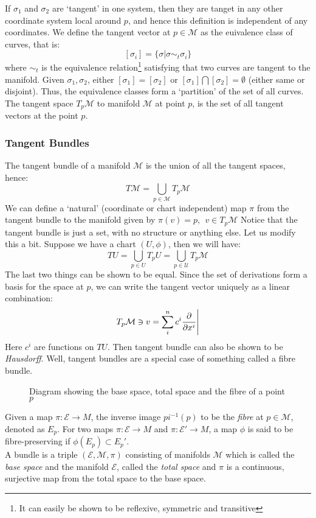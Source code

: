 If $\sigma_1$ and $\sigma_2$ are `tangent' in one system, then they are tanget in any other coordinate system local around $p$, and hence this definition is independent of any coordinates. We define the tangent vector at $p \in \mathcal{M}$ as the euivalence class of curves, that is:
$$[\sigma_i] = \{\sigma | \sigma \sim_t \sigma_i \}$$
where $\sim_t$ is the equivalence relation\footnote{It can easily be shown to be reflexive, symmetric and transitive} satisfying that two curves are tangent to the manifold. Given $\sigma_1, \sigma_2$, either $[\sigma_1]=[\sigma_2]$ or $[\sigma_1]\bigcap [\sigma_2] = \emptyset$ (either same or disjoint). Thus, the equivalence classes form a `partition' of the set of all curves. The tangent space $T_p\mathcal{M}$ to manifold $\mathcal{M}$ at point $p$, is the set of all tangent vectors at the point $p$. 
\subsubsection{Tangent Bundles}
The tangent bundle of a manifold $\mathcal{M}$ is the union of all the tangent spaces, hence: 
$$T\mathcal{M} = \bigcup\limits_{p\in \mathcal{M}}T_p\mathcal{M}$$
We can define a `natural' (coordinate or chart independent) map $\pi$ from the tangent bundle to the manifold given by $\pi(v) = p, \ \ v \in T_p\mathcal{M}$
Notice that the tangent bundle is just a set, with no structure or anything else. Let us modify this a bit. Suppose we have a chart $(U,\phi)$, then we will have:
$$TU =  \bigcup\limits_{p\in {U}}T_p{U}= \bigcup\limits_{p\in \mathcal{U}}T_p\mathcal{M}$$ 
The last two things can be shown to be equal. Since the set of derivations form a basis for the space at $p$, we can write the tangent vector uniquely as a linear combination:
$$T_p\mathcal{M}\ni v = \sum\limits_{i}^n c^i \pdv{x^i}\Bigg|$$
Here $c^i$ are functions on $TU$. Then tangent bundle can also be shown to be \textit{Hausdorff}. Well, tangent bundles are a special case of something called a fibre bundle. 
\begin{figure}[H]
  \centering 
  
  \caption{Diagram showing the base space, total space and the fibre of a point $p$}
\end{figure}
\begin{definition}[Bundle]
  Given a map $\pi: \mathcal{E}\rightarrow M$, the inverse image $pi^{-1}(p)$ to be the \textit{fibre} at $p\in \mathcal{M}$, denoted as $E_p$. For two maps $\pi: \mathcal{E}\rightarrow M$ and $\pi: \mathcal{E}'\rightarrow M$, a map $\phi$ is said to be fibre-preserving if $\phi(E_p)\subset E_p'$.\\[0.2cm]
  A bundle is a triple $(\mathcal{E},\mathcal{M},\pi)$ consisting of manifolds $\mathcal{M}$ which is called the \textit{base space} and the manifold $\mathcal{E}$, called the \textit{total space} and $\pi$ is a continuous, surjective map from the total space to the base space.  
\end{definition}

